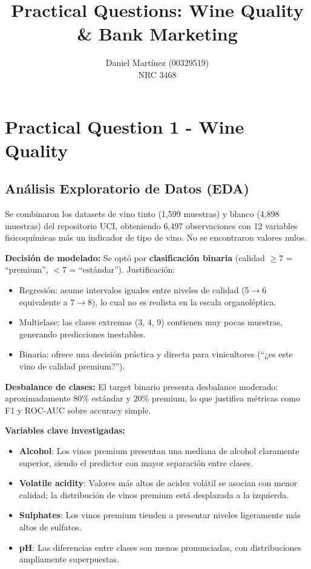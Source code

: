 \documentclass[11pt,spanish]{article}
\begin{document}
\title{\textbf{Practical Questions: Wine Quality \& Bank Marketing}}

\author{Daniel Martínez (00329519) \\ NRC 3468}

\maketitle

\section{Practical Question 1 - Wine Quality}

\subsection{Análisis Exploratorio de Datos (EDA)}

Se combinaron los datasets de vino tinto (1,599 muestras) y blanco (4,898 muestras) del repositorio UCI, obteniendo 6,497 observaciones con 12 variables fisicoquímicas más un indicador de tipo de vino. No se encontraron valores nulos.

\textbf{Decisión de modelado:} Se optó por \textbf{clasificación binaria} (calidad $\geq 7$ = ``premium'', $< 7$ = ``estándar''). Justificación:
\begin{itemize}
    \item Regresión: asume intervalos iguales entre niveles de calidad (5$\to$6 equivalente a 7$\to$8), lo cual no es realista en la escala organoléptica.
    \item Multiclase: las clases extremas (3, 4, 9) contienen muy pocas muestras, generando predicciones inestables.
    \item Binaria: ofrece una decisión práctica y directa para vinicultores (``¿es este vino de calidad premium?'').
\end{itemize}

\textbf{Desbalance de clases:} El target binario presenta desbalance moderado: aproximadamente 80\% estándar y 20\% premium, lo que justifica métricas como F1 y ROC-AUC sobre accuracy simple.

\textbf{Variables clave investigadas:}
\begin{itemize}
    \item \textbf{Alcohol}: Los vinos premium presentan una mediana de alcohol claramente superior, siendo el predictor con mayor separación entre clases.
    \item \textbf{Volatile acidity}: Valores más altos de acidez volátil se asocian con menor calidad; la distribución de vinos premium está desplazada a la izquierda.
    \item \textbf{Sulphates}: Los vinos premium tienden a presentar niveles ligeramente más altos de sulfatos.
    \item \textbf{pH}: Las diferencias entre clases son menos pronunciadas, con distribuciones ampliamente superpuestas.
\end{itemize}
\end{document}
